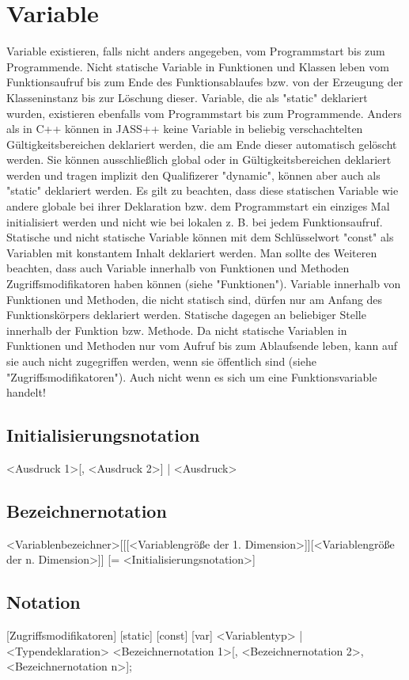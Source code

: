 \chapter{Variable}
Variable existieren, falls nicht anders angegeben, vom Programmstart bis zum Programmende. Nicht statische Variable in Funktionen und
Klassen leben vom Funktionsaufruf bis zum Ende des Funktionsablaufes bzw. von der Erzeugung der Klasseninstanz
bis zur Löschung dieser.
Variable, die als "static" deklariert wurden, existieren ebenfalls vom Programmstart bis zum Programmende.
Anders als in C++ können in JASS++ keine Variable in beliebig verschachtelten Gültigkeitsbereichen deklariert werden, die am Ende dieser
automatisch gelöscht werden.
Sie können ausschließlich global oder in Gültigkeitsbereichen deklariert werden und tragen implizit den Qualifizerer "dynamic",
können aber auch als "static" deklariert werden. Es gilt zu beachten, dass diese statischen Variable wie andere globale
bei ihrer Deklaration bzw. dem Programmstart ein einziges Mal initialisiert werden und nicht wie bei lokalen z. B. bei jedem Funktionsaufruf.
Statische und nicht statische Variable können mit dem Schlüsselwort "const" als Variablen mit konstantem Inhalt deklariert werden.
Man sollte des Weiteren beachten, dass auch Variable innerhalb von Funktionen und Methoden Zugriffsmodifikatoren haben können (siehe "Funktionen").
Variable innerhalb von Funktionen und Methoden, die nicht statisch sind, dürfen nur am Anfang des Funktionskörpers deklariert werden.
Statische dagegen an beliebiger Stelle innerhalb der Funktion bzw. Methode.
Da nicht statische Variablen in Funktionen und Methoden nur vom Aufruf bis zum Ablaufsende leben, kann auf sie auch nicht zugegriffen werden, wenn sie
öffentlich sind (siehe "Zugriffsmodifikatoren"). Auch nicht wenn es sich um eine Funktionsvariable handelt!

\section{Initialisierungsnotation}
{ <Ausdruck 1>[, <Ausdruck 2>] } | <Ausdruck>

\section{Bezeichnernotation}
<Variablenbezeichner>[[[<Variablengröße der 1. Dimension>]][<Variablengröße der n. Dimension>]] [= <Initialisierungsnotation>]

\section{Notation}
[Zugriffsmodifikatoren] [static] [const] [var] <Variablentyp> | <Typendeklaration> <Bezeichnernotation 1>[, <Bezeichnernotation 2>, <Bezeichnernotation n>];

